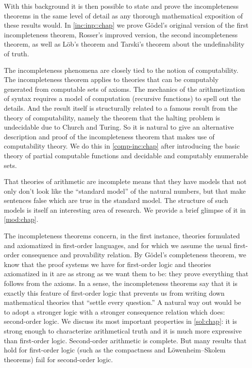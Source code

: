 With this background it is then possible to state and prove the
incompleteness theorems in the same level of detail as any thorough
mathematical exposition of these results would. In
\cref{inc:inp::chap} we prove G\"odel's original version of the first
incompleteness theorem, Rosser's improved version, the second
incompleteness theorem, as well as L\"ob's theorem and Tarski's
theorem about the undefinability of truth.

The incompleteness phenomena are closely tied to the notion of
computability. The incompleteness theorem applies to theories that can
be computably generated from computable sets of axioms. The mechanics
of the arithmetization of syntax requires a model of computation
(recursive functions) to spell out the details. And the result itself
is structurally related to a famous result from the theory of
computability, namely the theorem that the halting problem is
undecidable due to Church and Turing. So it is natural to give an
alternative description and proof of the incompleteness theorem that
makes use of computability theory. We do this in \cref{comp-inc:chap}
after introducing the basic theory of partial computable functions
and decidable and computably enumerable sets.

That theories of arithmetic are incomplete means that they have models
that not only don't look like the ``standard model'' of the natural
numbers, but that make sentences false which are true in the standard
model. The structure of such models is itself an interesting area of
research. We provide a brief glimpse of it in \cref{mod:chap}.

The incompleteness theorems concern, in the first instance, theories
formulated and axiomatized in first-order languages, and for which we
assume the usual first-order consequence and provability relation. By
G\"odel's completeness theorem, we know that the proof systems we have
for first-order logic and theories axiomatized in it are as strong as
we want them to be: they prove everything that follows from the
axioms. In a sense, the incompleteness theorems say that it is exactly
this feature of first-order logic that prevents us from writing down
mathematical theories that ``settle every question.'' A natural way
out would be to adopt a stronger logic with a stronger consequence
relation which does: second-order logic. We discuss its most important
properties in \cref{sol:chap}: it is strong enough to characterize
arithmetical truth and it is much more expressive than first-order
logic. Second-order arithmetic is complete. But many results that hold
for first-order logic (such as the compactness and L\"owenheim--Skolem
theorems) fail for second-order logic.

